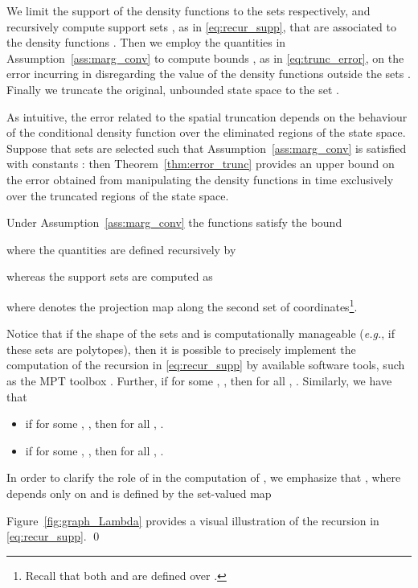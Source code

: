\documentclass{LMCS}
\def\eg{{\em e.g.}\xspace}
\begin{document}
We limit the support of the density functions  to the sets  respectively, 
and recursively compute support sets , as in \eqref{eq:recur_supp}, 
that are associated to the density functions . 
Then we employ the quantities  in Assumption~\ref{ass:marg_conv} 
to compute bounds , as in \eqref{eq:trunc_error}, 
on the error incurring in disregarding the value of the density functions  outside the sets . 
Finally we truncate the original, unbounded state space to the set .  

As intuitive, the error related to the spatial truncation depends on the behaviour of the conditional density function  over the eliminated regions of the state space. 
Suppose that sets  are selected such that Assumption~\ref{ass:marg_conv} is satisfied with constants :  
then Theorem~\ref{thm:error_trunc} provides an upper bound on the error obtained from manipulating the density functions in time  exclusively over the truncated regions of the state space. 
\begin{thm}
\label{thm:bound_behaviour}
Under Assumption~\ref{ass:marg_conv}
the functions  satisfy the bound

where the quantities  are defined recursively by

whereas the support sets  are computed as 

where  denotes the projection map along the second set of coordinates\footnote{Recall that both  and  are defined over .}.
\end{thm}

\begin{rem}
Notice that if the shape of the sets  and  is computationally manageable (\eg, if these sets are polytopes),  
then it is possible to precisely implement the computation of the recursion in \eqref{eq:recur_supp} by available software tools, 
such as the MPT toolbox \cite{mpt}. 
Further, 
if for some , , then for all , . 
Similarly, we have that 
\begin{itemize}
\item if for some , , then for all , .
\item if for some , , then for all , . 
\end{itemize}  
In order to clarify the role of  in the computation of , 
we emphasize that , 
where  depends only on  and is defined by the set-valued map

Figure~\ref{fig:graph_Lambda} provides a visual illustration of the recursion in \eqref{eq:recur_supp}. \qed
\end{rem}
\end{document}
